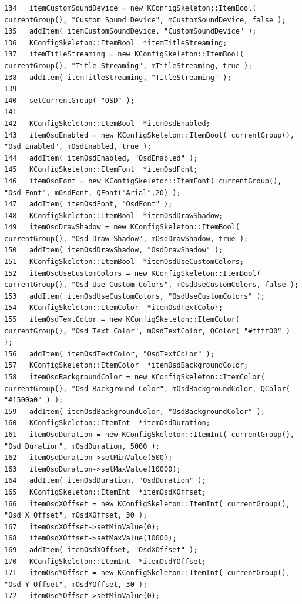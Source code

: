 \begin{verbatim}
134   itemCustomSoundDevice = new KConfigSkeleton::ItemBool( currentGroup(), "Custom Sound Device", mCustomSoundDevice, false );
135   addItem( itemCustomSoundDevice, "CustomSoundDevice" );
136   KConfigSkeleton::ItemBool  *itemTitleStreaming;
137   itemTitleStreaming = new KConfigSkeleton::ItemBool( currentGroup(), "Title Streaming", mTitleStreaming, true );
138   addItem( itemTitleStreaming, "TitleStreaming" );
139 
140   setCurrentGroup( "OSD" );
141 
142   KConfigSkeleton::ItemBool  *itemOsdEnabled;
143   itemOsdEnabled = new KConfigSkeleton::ItemBool( currentGroup(), "Osd Enabled", mOsdEnabled, true );
144   addItem( itemOsdEnabled, "OsdEnabled" );
145   KConfigSkeleton::ItemFont  *itemOsdFont;
146   itemOsdFont = new KConfigSkeleton::ItemFont( currentGroup(), "Osd Font", mOsdFont, QFont("Arial",20) );
147   addItem( itemOsdFont, "OsdFont" );
148   KConfigSkeleton::ItemBool  *itemOsdDrawShadow;
149   itemOsdDrawShadow = new KConfigSkeleton::ItemBool( currentGroup(), "Osd Draw Shadow", mOsdDrawShadow, true );
150   addItem( itemOsdDrawShadow, "OsdDrawShadow" );
151   KConfigSkeleton::ItemBool  *itemOsdUseCustomColors;
152   itemOsdUseCustomColors = new KConfigSkeleton::ItemBool( currentGroup(), "Osd Use Custom Colors", mOsdUseCustomColors, false );
153   addItem( itemOsdUseCustomColors, "OsdUseCustomColors" );
154   KConfigSkeleton::ItemColor  *itemOsdTextColor;
155   itemOsdTextColor = new KConfigSkeleton::ItemColor( currentGroup(), "Osd Text Color", mOsdTextColor, QColor( "#ffff00" ) );
156   addItem( itemOsdTextColor, "OsdTextColor" );
157   KConfigSkeleton::ItemColor  *itemOsdBackgroundColor;
158   itemOsdBackgroundColor = new KConfigSkeleton::ItemColor( currentGroup(), "Osd Background Color", mOsdBackgroundColor, QColor( "#1500a0" ) );
159   addItem( itemOsdBackgroundColor, "OsdBackgroundColor" );
160   KConfigSkeleton::ItemInt  *itemOsdDuration;
161   itemOsdDuration = new KConfigSkeleton::ItemInt( currentGroup(), "Osd Duration", mOsdDuration, 5000 );
162   itemOsdDuration->setMinValue(500);
163   itemOsdDuration->setMaxValue(10000);
164   addItem( itemOsdDuration, "OsdDuration" );
165   KConfigSkeleton::ItemInt  *itemOsdXOffset;
166   itemOsdXOffset = new KConfigSkeleton::ItemInt( currentGroup(), "Osd X Offset", mOsdXOffset, 30 );
167   itemOsdXOffset->setMinValue(0);
168   itemOsdXOffset->setMaxValue(10000);
169   addItem( itemOsdXOffset, "OsdXOffset" );
170   KConfigSkeleton::ItemInt  *itemOsdYOffset;
171   itemOsdYOffset = new KConfigSkeleton::ItemInt( currentGroup(), "Osd Y Offset", mOsdYOffset, 30 );
172   itemOsdYOffset->setMinValue(0);

\end{verbatim}
